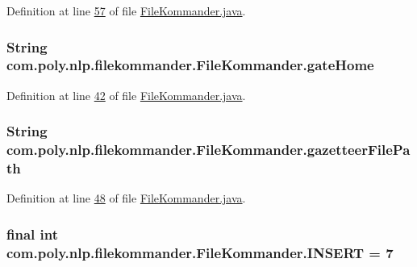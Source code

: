 Definition at line \hyperlink{L57}{57} of file \hyperlink{}{File\-Kommander.\-java}.

\hypertarget{classcom_1_1poly_1_1nlp_1_1filekommander_1_1_file_kommander_a4bdc4a5222eda1d37838da216256504e}{
\subsubsection[{gate\-Home}]{\setlength{\rightskip}{0pt plus 5cm}String com.\-poly.\-nlp.\-filekommander.\-File\-Kommander.\-gate\-Home\hspace{0.3cm}{\ttfamily [private]}}}\label{classcom_1_1poly_1_1nlp_1_1filekommander_1_1_file_kommander_a4bdc4a5222eda1d37838da216256504e}


Definition at line \hyperlink{L42}{42} of file \hyperlink{}{File\-Kommander.\-java}.

\hypertarget{classcom_1_1poly_1_1nlp_1_1filekommander_1_1_file_kommander_addc44216b38536fd6b1ade38a6c2abdc}{
\subsubsection[{gazetteer\-File\-Path}]{\setlength{\rightskip}{0pt plus 5cm}String com.\-poly.\-nlp.\-filekommander.\-File\-Kommander.\-gazetteer\-File\-Path\hspace{0.3cm}{\ttfamily [private]}}}\label{classcom_1_1poly_1_1nlp_1_1filekommander_1_1_file_kommander_addc44216b38536fd6b1ade38a6c2abdc}


Definition at line \hyperlink{L48}{48} of file \hyperlink{}{File\-Kommander.\-java}.

\hypertarget{classcom_1_1poly_1_1nlp_1_1filekommander_1_1_file_kommander_aea640bc0ab06be33089d86d4847bcfbd}{
\subsubsection[{I\-N\-S\-E\-R\-T}]{\setlength{\rightskip}{0pt plus 5cm}final int com.\-poly.\-nlp.\-filekommander.\-File\-Kommander.\-I\-N\-S\-E\-R\-T = 7\hspace{0.3cm}{\ttfamily [static]}}}\label{classcom_1_1poly_1_1nlp_1_1filekommander_1_1_file_kommander_aea640bc0ab06be33089d86d4847bcfbd}


